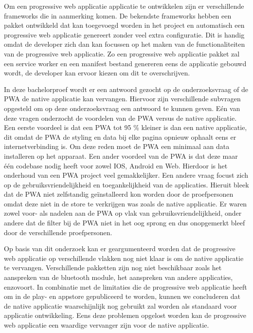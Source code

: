 Om een progressive web applicatie applicatie te ontwikkelen zijn er verschillende frameworks die in aanmerking komen. De bekendste frameworks hebben een pakket ontwikkeld dat kan toegevoegd worden in het project en automatisch een progressive web applicatie genereert zonder veel extra configuratie. Dit is handig omdat de developer zich dan kan focussen op het maken van de functionaliteiten van de progressive web applicatie. Zo een progressive web applicatie pakket zal een service worker en een manifest bestand genereren eens de applicatie gebouwd wordt, de developer kan ervoor kiezen om dit te overschrijven. 

In deze bachelorproef wordt er een antwoord gezocht op de onderzoeksvraag of de PWA de native applicatie kan vervangen. Hiervoor zijn verschillende subvragen opgesteld om op deze onderzoeksvraag een antwoord te kunnen geven. Eén van deze vragen onderzocht de voordelen van de PWA versus de native applicatie. Een eerste voordeel is dat een PWA tot 95 \% kleiner is dan een native applicatie, dit omdat de PWA de styling en data bij elke pagina opnieuw ophaalt eens er internetverbinding is. Om deze reden moet de PWA een minimaal aan data installeren op het apparaat. Een ander voordeel van de PWA is dat deze maar één codebase nodig heeft voor zowel IOS, Android en Web. Hierdoor is het onderhoud van een PWA project veel gemakkelijker.
Een andere vraag focust zich op de gebruiksvriendelijkheid en toegankelijkheid van de applicaties. Hieruit bleek dat de PWA niet zelfstandig geïnstalleerd kon worden door de proefpersonen omdat deze niet in de store te verkrijgen was zoals de native applicatie. Er waren zowel voor- als nadelen aan de PWA op vlak van gebruiksvriendelijkheid, onder andere dat de filter bij de PWA niet in het oog sprong en dus onopgemerkt bleef door de verschillende proefpersonen. 


Op basis van dit onderzoek kan er geargumenteerd worden dat de progressive web applicatie op verschillende vlakken nog niet klaar is om de native applicatie te vervangen. Verschillende pakketten zijn nog niet beschikbaar zoals het aanspreken van de bluetooth module, het aanspreken van andere applicaties, enzovoort. In combinatie met de limitaties die de progressive web applicatie heeft om in de play- en appstore gepubliceerd te worden, kunnen we concluderen dat de native applicatie waarschijnlijk nog gebruikt zal worden als standaard voor applicatie ontwikkeling. Eens deze problemen opgelost worden kan de progressive web applicatie een waardige vervanger zijn voor de native applicatie.


